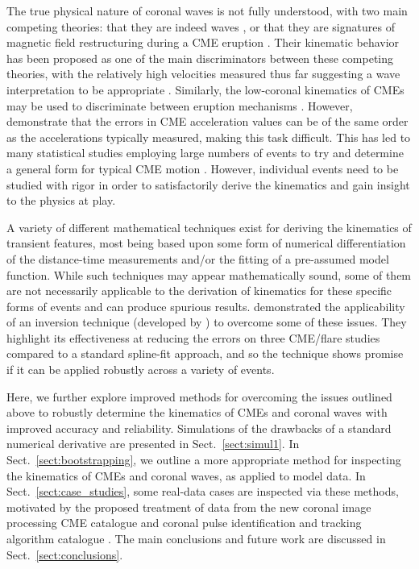 \documentclass[structabstract]{aa}
\begin{document}
The true physical nature of coronal waves is not fully understood, with two main competing theories: that they are indeed waves \citep[e.g.,][]{2010ApJ...716L..57V, 2012ApJ...754....7S}, or that they are signatures of magnetic field restructuring during a CME eruption \citep[e.g.,][]{2011ApJ...738..167S,2011ApJ...732L..20C}. Their kinematic behavior has been proposed as one of the main discriminators between these competing theories, with the relatively high velocities measured thus far suggesting a wave interpretation to be appropriate \citep{2011A&A...532A.151W, 2012ApJ...753..112Z}. Similarly, the low-coronal kinematics of CMEs may be used to discriminate between eruption mechanisms \citep[see, for example,][and the CME models discussed therein]{2010A&A...516A..44L}. However, \citet{2007ApJ...657.1117W} demonstrate that the errors in CME acceleration values can be of the same order as the accelerations typically measured, making this task difficult. This has led to many statistical studies employing large numbers of events to try and determine a general form for typical CME motion \citep[e.g.,][]{2000GeoRL..27..145G, 2003AdSpR..32.2637D, 2006ApJ...649.1100Z}. However, individual events need to be studied with rigor in order to satisfactorily derive the kinematics and gain insight to the physics at play.

A variety of different mathematical techniques exist for deriving the kinematics of transient features, most being based upon some form of numerical differentiation of the distance-time measurements and/or the fitting of a pre-assumed model function. While such techniques may appear mathematically sound, some of them are not necessarily applicable to the derivation of kinematics for these specific forms of events and can produce spurious results. \citet{2010ApJ...712.1410T} demonstrated the applicability of an inversion technique (developed by \citealt{2005SoPh..227..299K}) to overcome some of these issues. They highlight its effectiveness at reducing the errors on three CME/flare studies compared to a standard spline-fit approach, and so the technique shows promise if it can be applied robustly across a variety of events.

Here, we further explore improved methods for overcoming the issues outlined above to robustly determine the kinematics of CMEs and coronal waves with improved accuracy and reliability. Simulations of the drawbacks of a standard numerical derivative are presented in Sect.~\ref{sect:simul1}. In Sect.~\ref{sect:bootstrapping}, we outline a more appropriate method for inspecting the  kinematics of CMEs and coronal waves, as applied to model data. In Sect.~\ref{sect:case_studies}, some real-data cases are inspected via these methods, motivated by the proposed treatment of data from the new coronal image processing CME catalogue \citep[CORIMP;][]{2012ApJ...752..144M, 2012ApJ...752..145B} and coronal pulse identification and tracking algorithm catalogue \citep[CorPITA;][]{2011A&A...531A..42L}. The main conclusions and future work are discussed in Sect.~\ref{sect:conclusions}.
\end{document}

